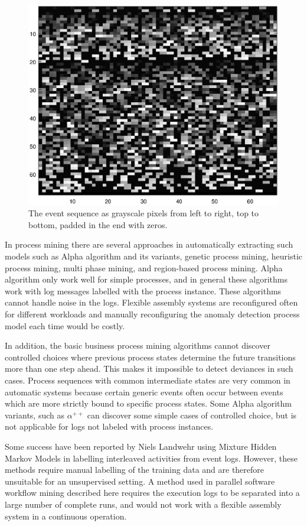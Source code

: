 \documentclass[journal]{IEEEtran}
\begin{document}
\begin{figure}[tb]
 \centering
 \includegraphics[width=8 cm,keepaspectratio=true]{./color_vis.eps}
 \caption{The event sequence as grayscale pixels from left to right, top to bottom, padded in the end with zeros.}
 \label{figure:color_vis}
\end{figure}

In process mining there are several approaches in automatically extracting such models such as Alpha algorithm and its 
variants, genetic process mining, heuristic process mining, multi phase mining, and region-based process mining. Alpha algorithm only work well for simple processes,
and in general these algorithms work with log messages labelled with the process instance. These algorithms cannot handle noise in the logs.
Flexible assembly systems are reconfigured often for different workloads and manually reconfiguring the anomaly
detection process model each time would be costly.

In addition, the basic business process mining algorithms cannot discover controlled choices where previous process states
determine the future transitions more than one step ahead. This makes it impossible to detect deviances in such cases. Process sequences with common intermediate states
are very common in automatic systems because certain generic events often occur between events which are more strictly bound to specific process states. Some Alpha algorithm
variants, such as $\alpha^{++}$ \cite{wen2007mining} can discover some simple cases of controlled choice, but is not applicable for logs not labeled with process instances.

Some success have been reported by Niels Landwehr using Mixture Hidden Markov Models \cite{landwehr2008modeling} in labelling interleaved activities from event logs.
However, these methods require manual labelling of the training data and are therefore unsuitable for an unsupervised setting.
A method used in parallel software workflow mining described here \cite{mining-program-workflow-from-interleaved-traces} requires the execution logs to be separated into
a large number of complete runs, and would not work with a flexible assembly system in a continuous operation.
\end{document}
